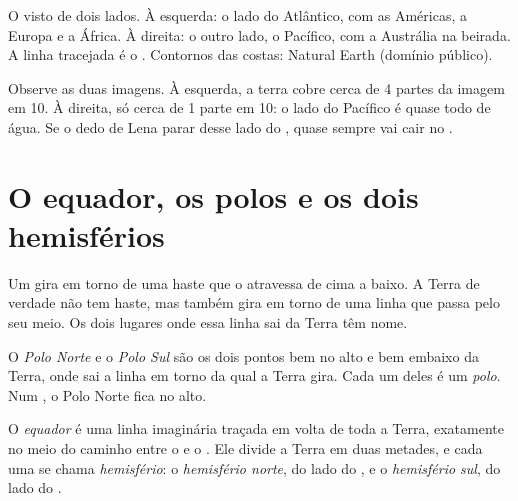 \begin{omfigure}
{\small O  visto de dois lados. À esquerda: o lado do  Atlântico,
com as Américas, a Europa e a África. À direita: o outro lado, o 
Pacífico, com a Austrália na beirada. A linha tracejada é o .
Contornos das costas: Natural Earth (domínio público).}
\label{fig:g3:continents-and-oceans:globes}
\end{omfigure}

\begin{remark}\label{rem:g3:continents-and-oceans:halves}
Observe as duas imagens. À esquerda, a terra cobre cerca de 4 partes da
imagem em 10. À direita, só cerca de 1 parte em 10: o lado do Pacífico é
quase todo de água. Se o dedo de Lena parar desse lado do , quase
sempre vai cair no .
\end{remark}

\section{O equador, os polos e os dois hemisférios}

Um  gira em torno de uma haste que o atravessa de cima a baixo. A
Terra de verdade não tem haste, mas também gira em torno de uma linha que
passa pelo seu meio. Os dois lugares onde essa linha sai da Terra têm nome.

\begin{definition}[Polo]\label{def:g3:continents-and-oceans:poles}
O \emph{Polo Norte} e o \emph{Polo
Sul} são os dois pontos bem no alto e bem embaixo da Terra,
onde sai a linha em torno da qual a Terra gira. Cada um deles é um
\emph{polo}. Num , o Polo Norte fica no alto.
\end{definition}

\begin{definition}\label{def:g3:continents-and-oceans:equator}
O \emph{equador} é uma linha imaginária traçada em volta de
toda a Terra, exatamente no meio do caminho entre o  e o .
Ele divide a Terra em duas metades, e cada uma se chama
\emph{hemisfério}: o \emph{hemisfério
norte}, do lado do , e
o \emph{hemisfério sul}, do lado do
.
\end{definition}

